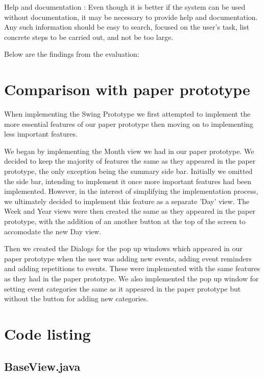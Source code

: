 \documentclass{article}
\begin{document}
\item Help and documentation : Even though it is better if the system can be used without documentation, it may be necessary to provide help and documentation. Any such information should be easy to search, focused on the user's task, list concrete steps to be carried out, and not be too large.    


Below are the findings from the evaluation:








\section{Comparison with paper prototype}

When implementing the Swing Prototype we first attempted to implement
the more essential features of our paper prototype then moving on to
implementing less important features.

We began by implementing the Month view we had in our paper prototype.
We decided to keep the majority of features the same as they appeared
in the paper prototype, the only exception being the summary side bar.
Initially we omitted the side bar, intending to implement it once more
important features had been implemented. However, in the interest of
simplifying the implementation process, we ultimately decided to
implement this feature as a separate 'Day' view. The Week and Year
views were then created the same as they appeared in the paper
prototype, with the addition of an another button at the top of the
screen to accomodate the new Day view.

Then we created the Dialogs for the pop up windows which appeared in our
paper prototype when the user was adding new events, adding event
reminders and adding repetitions to events. These were implemented with
the same features as they had in the paper prototype. We also
implemented the pop up window for setting event categories the same as
it appeared in the paper prototype but without the button for adding new
categories.

\appendix

\section{Code listing}

\subsection{BaseView.java}
\end{document}
